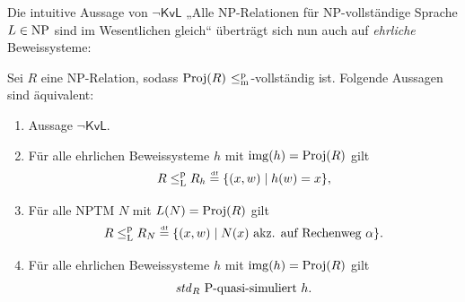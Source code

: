 Die intuitive Aussage von $\neg\mathsf{KvL}$ „Alle NP-Relationen für NP-vollständige Sprache $L\in\NP$ sind im Wesentlichen gleich“ überträgt sich nun auch auf \emph{ehrliche} Beweissysteme:
\begin{theorem}\label{thm:kvl-ps}
    Sei $R$ eine NP-Relation, sodass $\Proj(R)$ $\leqmp$-vollständig ist.
    Folgende Aussagen sind äquivalent:
    \begin{enumerate}
        \item Aussage $\neg\mathsf{KvL}$.
        \item Für alle ehrlichen Beweissysteme $h$ mit $\img(h)=\Proj(R)$ gilt
\[ R \leqlp R_{h}\defeq  \{ (x, w) \mid  \text{$h(w)=x$}\}, \]
        \item Für alle NPTM $N$ mit $L(N)=\Proj(R)$ gilt
            \[ R \leqlp R_N \defeq  \{ (x, w) \mid  \text{$N(x)$ akz. auf Rechenweg $\alpha$}\}. \]
        \item Für alle ehrlichen Beweissysteme $h$ mit $\img(h)=\Proj(R)$ gilt
    \[  \text{$\mathit{std}_R$ $\P$-quasi-simuliert $h$}. \]
    \end{enumerate}
\end{theorem}
